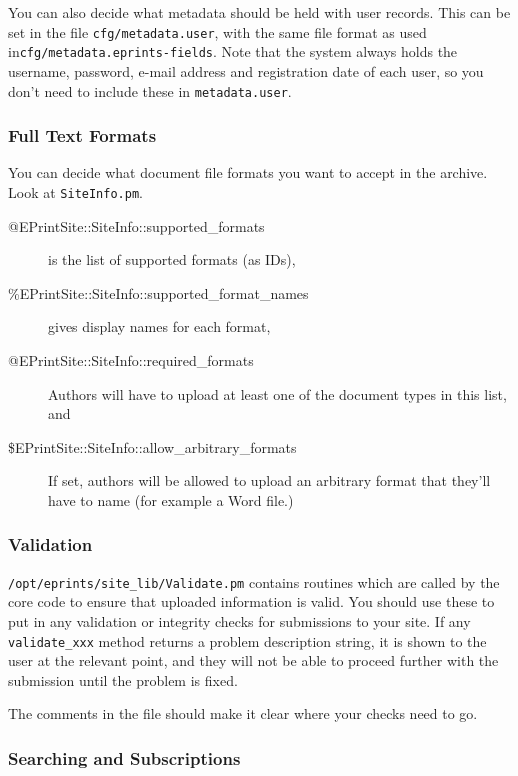 {You can also decide what metadata should be held with user records. This can be set in the file {\tt cfg/metadata.user}, with the same file format as used in{\tt cfg/metadata.eprints-fields}. Note that the system always holds the username, password, e-mail address and registration date of each user, so you don't need to include these in {\tt metadata.user}.


\subsubsection{Full Text Formats}

You can decide what document file formats you want to accept in the archive. Look at {\tt SiteInfo.pm}.

\begin{description}
\item[@EPrintSite::SiteInfo::supported\_formats] is the list of supported formats (as IDs),
\item[\%EPrintSite::SiteInfo::supported\_format\_names] gives display names for each format,
\item[@EPrintSite::SiteInfo::required\_formats] Authors will have to upload at least one of the document types in this list, and
\item[\$EPrintSite::SiteInfo::allow\_arbitrary\_formats] If set, authors will be allowed to upload an arbitrary format that they'll have to name (for example a Word file.)
\end{description}


\subsubsection{Validation}

{\tt /opt/eprints/site\_lib/Validate.pm} contains routines which are called by the core code to ensure that uploaded information is valid. You should use these to put in any validation or integrity checks for submissions to your site. If any {\tt validate\_xxx} method returns a problem description string, it is shown to the user at the relevant point, and they will not be able to proceed further with the submission until the problem is fixed.

The comments in the file should make it clear where your checks need to go.


\subsubsection{Searching and Subscriptions}

}

